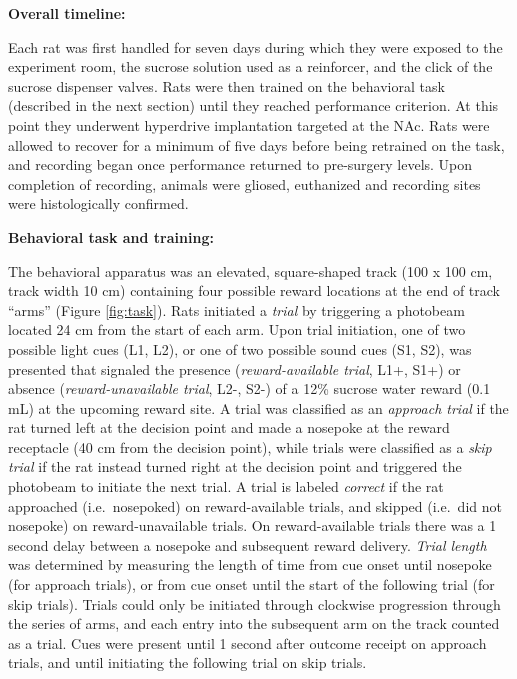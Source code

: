 \documentclass[11pt]{article}
\begin{document}
{\bf Overall timeline:}

Each rat was first handled for seven days during which they were
exposed to the experiment room, the sucrose solution used as a
reinforcer, and the click of the sucrose dispenser valves. Rats were
then trained on the behavioral task (described in the next section)
until they reached performance criterion. At this point they
underwent hyperdrive implantation targeted at the NAc. Rats were
allowed to recover for a minimum of five days before being retrained
on the task, and recording began once performance returned to
pre-surgery levels. Upon completion of recording, animals were gliosed,
euthanized and recording sites were histologically confirmed.

{\bf Behavioral task and training:}

The behavioral apparatus was an elevated, square-shaped track (100 x
100 cm, track width 10 cm) containing four possible reward locations
at the end of track ``arms'' (Figure \ref{fig:task}). Rats initiated a
{\it trial} by triggering a photobeam located 24 cm from the start of
each arm. Upon trial initiation, one of two possible light cues (L1,
L2), or one of two possible sound cues (S1, S2), was presented that
signaled the presence ({\it reward-available trial}, L1+, S1+) or
absence ({\it reward-unavailable trial}, L2-, S2-) of a 12\% sucrose
water reward (0.1 mL) at the upcoming reward site. A trial was
classified as an {\it approach trial} if the rat turned left at the
decision point and made a nosepoke at the reward receptacle (40 cm
from the decision point), while trials were classified as a {\it skip
trial} if the rat instead turned right at the decision point and
triggered the photobeam to initiate the next trial. A trial is labeled
{\it correct} if the rat approached (i.e.\ nosepoked) on
reward-available trials, and skipped (i.e.\ did not nosepoke) on
reward-unavailable trials. On reward-available trials there was a 1
second delay between a nosepoke and subsequent reward delivery. {\it
Trial length} was determined by measuring the length of time from
cue onset until nosepoke (for approach trials), or from cue onset
until the start of the following trial (for skip trials). Trials could
only be initiated through clockwise progression through the series of
arms, and each entry into the subsequent arm on the track counted as a
trial. Cues were present until 1  second after outcome receipt on approach trials, and until initiating the following trial on skip trials.
\end{document}
